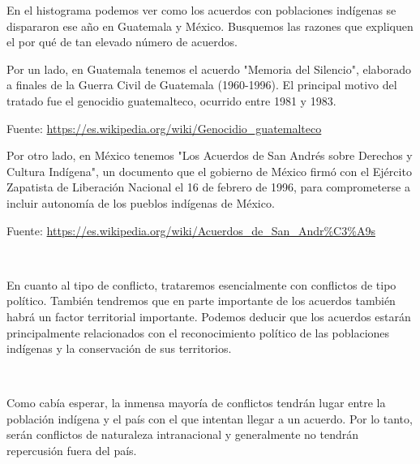 \documentclass[11pt]{article}
\begin{document}
    En el histograma podemos ver como los acuerdos con poblaciones indígenas
se dispararon ese año en Guatemala y México. Busquemos las razones que
expliquen el por qué de tan elevado número de acuerdos.

Por un lado, en Guatemala tenemos el acuerdo "Memoria del Silencio",
elaborado a finales de la Guerra Civil de Guatemala (1960-1996). El
principal motivo del tratado fue el genocidio guatemalteco, ocurrido
entre 1981 y 1983.

Fuente: \url{https://es.wikipedia.org/wiki/Genocidio\_guatemalteco}

Por otro lado, en México tenemos "Los Acuerdos de San Andrés sobre
Derechos y Cultura Indígena", un documento que el gobierno de México
firmó con el Ejército Zapatista de Liberación Nacional el 16 de febrero
de 1996, para comprometerse a incluir autonomía de los pueblos indígenas
de México.

Fuente: \url{https://es.wikipedia.org/wiki/Acuerdos\_de\_San\_Andr\%C3\%A9s}

    \begin{center}
    \end{center}
    { \hspace*{\fill} \\}
    
    En cuanto al tipo de conflicto, trataremos esencialmente con conflictos
de tipo político. También tendremos que en parte importante de los acuerdos
también habrá un factor territorial importante. Podemos deducir que los
acuerdos estarán principalmente relacionados con el reconocimiento
político de las poblaciones indígenas y la conservación de sus
territorios.
        
    \begin{center}
    \end{center}
    { \hspace*{\fill} \\}
    
    Como cabía esperar, la inmensa mayoría de conflictos tendrán lugar entre
la población indígena y el país con el que intentan llegar a un acuerdo.
Por lo tanto, serán conflictos de naturaleza intranacional y
generalmente no tendrán repercusión fuera del país.
        
    \begin{center}
    \end{center}
    { \hspace*{\fill} \\}
    
\end{document}
